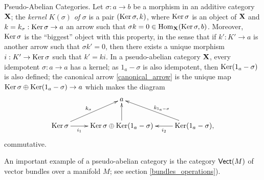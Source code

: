 {\sc Pseudo-Abelian Categories.} Let $\sigma :a\to b$ be a morphism in
an additive category ${\bf X}$; the \emph{kernel} $K(\sigma )$
\emph{of} $\sigma$ is a pair $(\operatorname{Ker}\sigma ,k)$, where
$\operatorname{Ker}\sigma$ is an object of ${\bf X}$ and $k=k_{\sigma
}:\operatorname{Ker}\sigma \to a$ an arrow such that $\sigma k=0\in
\operatorname{Hom}_{\bf X}(\operatorname{Ker}\sigma ,b)$. Moreover, $\operatorname{Ker}\sigma$
is the ``biggest'' object with this property, in the sense that if
$k':K'\to a$ is another arrow such that $\sigma k'=0$, then there
exists a unique morphism $i:K'\to \operatorname{Ker}\sigma$ such that
$k'=ki$. In a pseudo-abelian category ${\bf X}$, every idempotent
$\sigma :a\to a$ has a kernel; as $1_a-\sigma$ is also idempotent,
then $\operatorname{Ker}(1_a-\sigma)$ is also defined; the canonical arrow
\eqref{canonical_arrow} is the unique map $\operatorname{Ker}\sigma \oplus
\operatorname{Ker}(1_a-\sigma )\to a$ which makes the diagram
$$
\xymatrix{
  & a & \\
  \opnm{Ker}\sigma \ar[ur]^{k_{\sigma}} \ar[r]_-{i_1} &
  \opnm{Ker}\sigma \oplus \opnm{Ker}(1_a-\sigma ) \ar[u] &
  \opnm{Ker}(1_a-\sigma ), \ar[ul]_{k_{1_a -\sigma }} \ar[l]^-{i_2} }
$$
commutative.

An important example of a pseudo-abelian category is the category
$\mathsf{Vect}(M)$ of vector bundles over a manifold $M$; see section
\ref{bundles_operations}).

